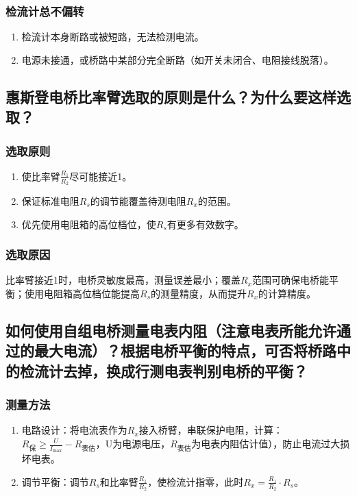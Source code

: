 \documentclass[]{../../templates/Report}%
\begin{document}
\begin{fullreportonly}
\subsubsection{检流计总不偏转}
\begin{enumerate}
   \item 检流计本身断路或被短路，无法检测电流。
   \item 电源未接通，或桥路中某部分完全断路（如开关未闭合、电阻接线脱落）。
\end{enumerate}
\subsection{惠斯登电桥比率臂选取的原则是什么？为什么要这样选取？}
\subsubsection{选取原则}
\begin{enumerate}
   \item 使比率臂\(\frac{R_1}{R_2}\)尽可能接近1。
   \item 保证标准电阻\(R_s\)的调节能覆盖待测电阻\(R_x\)的范围。
   \item 优先使用电阻箱的高位档位，使\(R_s\)有更多有效数字。
\end{enumerate}

\subsubsection{选取原因}
比率臂接近1时，电桥灵敏度最高，测量误差最小；覆盖\(R_x\)范围可确保电桥能平衡；使用电阻箱高位档位能提高\(R_s\)的测量精度，从而提升\(R_x\)的计算精度。
\subsection{如何使用自组电桥测量电表内阻（注意电表所能允许通过的最大电流）？根据电桥平衡的特点，可否将桥路中的检流计去掉，换成行测电表判别电桥的平衡？}
\subsubsection{测量方法}
\begin{enumerate}
    \item 电路设计：将电流表作为\(R_x\)接入桥臂，串联保护电阻，计算：\(R_{\text{保}}\geq\frac{U}{I_{\text{max}}} - R_{\text{表估}}\)，U为电源电压，\(R_{\text{表估}}\)为电表内阻估计值），防止电流过大损坏电表。
    \item 调节平衡：调节\(R_s\)和比率臂\(\frac{R_1}{R_2}\)，使检流计指零，此时\(R_x=\frac{R_1}{R_2} \cdot R_s\)。
\end{enumerate}

\end{fullreportonly}
\end{document}
